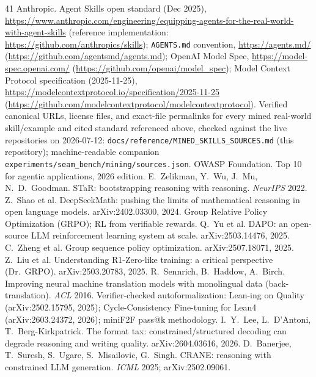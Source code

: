 \documentclass{article}
\begin{document}
\begin{thebibliography}{41}
 Anthropic. Agent Skills open standard (Dec 2025), \url{https://www.anthropic.com/engineering/equipping-agents-for-the-real-world-with-agent-skills} (reference implementation: \url{https://github.com/anthropics/skills}); \texttt{AGENTS.md} convention, \url{https://agents.md/} (\url{https://github.com/agentsmd/agents.md}); OpenAI Model Spec, \url{https://model-spec.openai.com/} (\url{https://github.com/openai/model_spec}); Model Context Protocol specification (2025-11-25), \url{https://modelcontextprotocol.io/specification/2025-11-25} (\url{https://github.com/modelcontextprotocol/modelcontextprotocol}).
 Verified canonical URLs, license files, and exact-file permalinks for every mined real-world skill/example and cited standard referenced above, checked against the live repositories on 2026-07-12: \texttt{docs/reference/MINED\_SKILLS\_SOURCES.md} (this repository); machine-readable companion \texttt{experiments/seam\_bench/mining/sources.json}.
 OWASP Foundation. Top 10 for agentic applications, 2026 edition.
 E.~Zelikman, Y.~Wu, J.~Mu, N.~D.~Goodman. STaR: bootstrapping reasoning with reasoning. \emph{NeurIPS} 2022.
 Z.~Shao et al. DeepSeekMath: pushing the limits of mathematical reasoning in open language models. arXiv:2402.03300, 2024. Group Relative Policy Optimization (GRPO); RL from verifiable rewards.
 Q.~Yu et al. DAPO: an open-source LLM reinforcement learning system at scale. arXiv:2503.14476, 2025.
 C.~Zheng et al. Group sequence policy optimization. arXiv:2507.18071, 2025.
 Z.~Liu et al. Understanding R1-Zero-like training: a critical perspective (Dr.\ GRPO). arXiv:2503.20783, 2025.
 R.~Sennrich, B.~Haddow, A.~Birch. Improving neural machine translation models with monolingual data (back-translation). \emph{ACL} 2016.
 Verifier-checked autoformalization: Lean-ing on Quality (arXiv:2502.15795, 2025); Cycle-Consistency Fine-tuning for Lean4 (arXiv:2603.24372, 2026); miniF2F pass@k methodology.
 I.~Y.~Lee, L.~D'Antoni, T.~Berg-Kirkpatrick. The format tax: constrained/structured decoding can degrade reasoning and writing quality. arXiv:2604.03616, 2026.
 D.~Banerjee, T.~Suresh, S.~Ugare, S.~Misailovic, G.~Singh. CRANE: reasoning with constrained LLM generation. \emph{ICML} 2025; arXiv:2502.09061.

\end{thebibliography}
\end{document}
